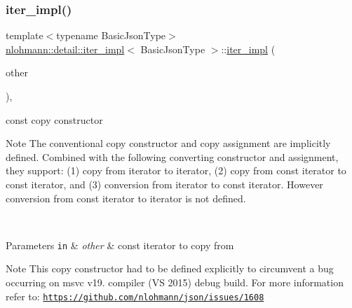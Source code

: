 \subsubsection{\texorpdfstring{iter\+\_\+impl()}{iter\_impl()}\hspace{0.1cm}{\footnotesize\ttfamily [3/4]}}
{\footnotesize\ttfamily template$<$typename Basic\+Json\+Type$>$ \\
\mbox{\hyperlink{classnlohmann_1_1detail_1_1iter__impl}{nlohmann\+::detail\+::iter\+\_\+impl}}$<$ Basic\+Json\+Type $>$\+::\mbox{\hyperlink{classnlohmann_1_1detail_1_1iter__impl}{iter\+\_\+impl}} (\begin{DoxyParamCaption}\item[{const \mbox{\hyperlink{classnlohmann_1_1detail_1_1iter__impl}{iter\+\_\+impl}}$<$ const Basic\+Json\+Type $>$ \&}]{other }\end{DoxyParamCaption})\hspace{0.3cm}{\ttfamily [inline]}, {\ttfamily [noexcept]}}



const copy constructor 

\begin{DoxyNote}{Note}
The conventional copy constructor and copy assignment are implicitly defined. Combined with the following converting constructor and assignment, they support\+: (1) copy from iterator to iterator, (2) copy from const iterator to const iterator, and (3) conversion from iterator to const iterator. However conversion from const iterator to iterator is not defined.
\end{DoxyNote}
~\newline

\begin{DoxyParams}[1]{Parameters}
\mbox{\tt in}  & {\em other} & const iterator to copy from \\
\hline
\end{DoxyParams}
\begin{DoxyNote}{Note}
This copy constructor had to be defined explicitly to circumvent a bug occurring on msvc v19. compiler (VS 2015) debug build. For more information refer to\+: \href{https://github.com/nlohmann/json/issues/1608}{\tt https\+://github.\+com/nlohmann/json/issues/1608} 
\end{DoxyNote}
\mbox{\label{classnlohmann_1_1detail_1_1iter__impl_a867f7eb55091be31b013adb3e46816d3}} 
